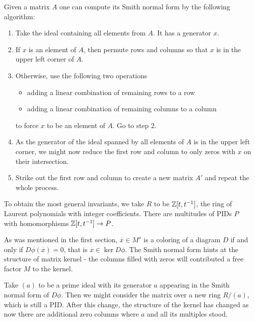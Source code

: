 {
  Given a matrix $A$ one can compute its Smith normal form by the following algorithm:
  \begin{enumerate}
    \item Take the ideal containing all elements from $A$. It has a generator $x$.
    \item If $x$ is an element of $A$, then permute rows and columns so that $x$ is in the upper left corner of $A$.
    \item Otherwise, use the following two operations 
      \begin{itemize}
        \item adding a linear combination of remaining rows to a row
        \item adding a linear combination of remaining columns to a column
      \end{itemize}
      to force $x$ to be an element of $A$. Go to step 2.
    \item As the generator of the ideal spanned by all elements of $A$ is in the upper left corner, we might now reduce the first row and column to only zeros with $x$ on their intersection. 
    \item Strike out the first row and column to create a new matrix $A'$ and repeat the whole process.
  \end{enumerate}
}

{%
To obtain the most general invariants, we take $R$ to be $\operatorname{\mathbb{Z}}[t, t^{-1}]$, the ring of Laurent polynomials with integer coefficients. There are multitudes of PIDs $P$ with homomorphisms $\operatorname{\mathbb{Z}}[t, t^{-1}]\to P$.
}


As was mentioned in the first section, $\overline{x}\in M^s$ is a coloring of a diagram $D$ if and only if $D\phi(\overline{x})=0$, that is $\overline{x}\in\ker D\phi$. The Smith normal form hints at the structure of matrix kernel - the columns filled with zeros will contributed a free factor $M$ to the kernel. 

Take $(a)$ to be a prime ideal with its generator $a$ appearing in the Smith normal form of $D\phi$. Then we might consider the matrix over a new ring $R/(a)$, which is still a PID. After this change, the structure of the kernel has changed as now there are additional zero columns where $a$ and all its multiples stood.

